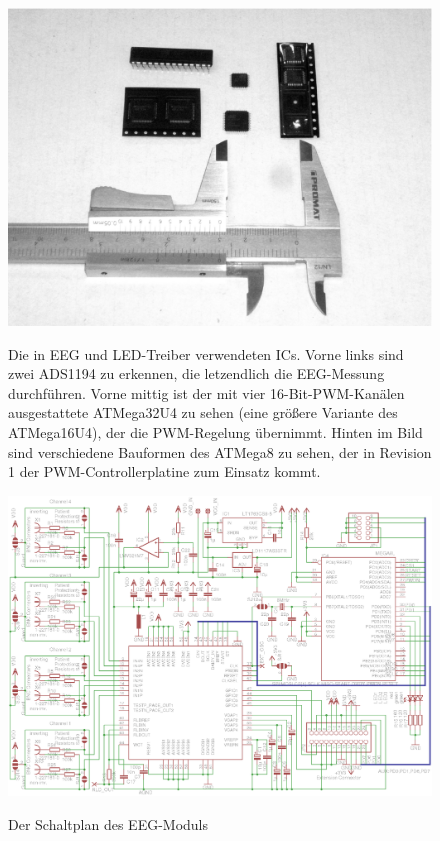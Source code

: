 \documentclass[12pt,a4paper,notitlepage]{article}
\begin{document}
\begin{figure}
\centering
\includegraphics[width=15cm]{images/chips_smaller.eps}
\label{ics_used}
\caption{Die in EEG und LED-Treiber verwendeten ICs. Vorne links sind zwei ADS1194 zu erkennen, die letzendlich die EEG-Messung durchführen. Vorne mittig ist der mit vier 16-Bit-PWM-Kanälen ausgestattete ATMega32U4 zu sehen (eine größere Variante des ATMega16U4), der die PWM-Regelung übernimmt. Hinten im Bild sind verschiedene Bauformen des ATMega8 zu sehen, der in Revision 1 der PWM-Controllerplatine zum Einsatz kommt.}
\end{figure}

\begin{landscape}
\begin{figure}
\begin{center}
\includegraphics{images/adc_schematic_02.eps}
\label{adc_schematic}
\end{center}
\caption{Der Schaltplan des EEG-Moduls}
\end{figure}
\end{landscape}
\end{document}
